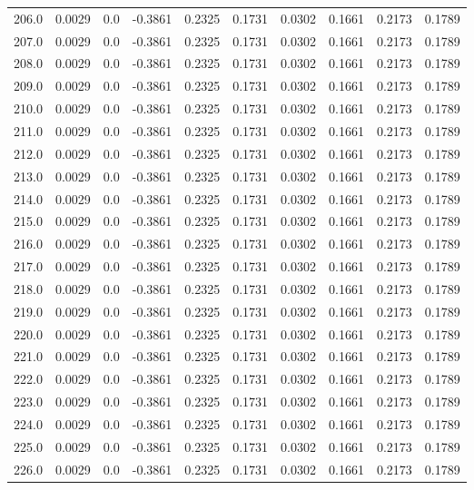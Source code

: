 \begin{longtable}{lrrrrrrrrr}
206.0 & 0.0029 & 0.0 & -0.3861 & 0.2325 & 0.1731 & 0.0302 & 0.1661 & 0.2173 & 0.1789 \\
207.0 & 0.0029 & 0.0 & -0.3861 & 0.2325 & 0.1731 & 0.0302 & 0.1661 & 0.2173 & 0.1789 \\
208.0 & 0.0029 & 0.0 & -0.3861 & 0.2325 & 0.1731 & 0.0302 & 0.1661 & 0.2173 & 0.1789 \\
209.0 & 0.0029 & 0.0 & -0.3861 & 0.2325 & 0.1731 & 0.0302 & 0.1661 & 0.2173 & 0.1789 \\
210.0 & 0.0029 & 0.0 & -0.3861 & 0.2325 & 0.1731 & 0.0302 & 0.1661 & 0.2173 & 0.1789 \\
211.0 & 0.0029 & 0.0 & -0.3861 & 0.2325 & 0.1731 & 0.0302 & 0.1661 & 0.2173 & 0.1789 \\
212.0 & 0.0029 & 0.0 & -0.3861 & 0.2325 & 0.1731 & 0.0302 & 0.1661 & 0.2173 & 0.1789 \\
213.0 & 0.0029 & 0.0 & -0.3861 & 0.2325 & 0.1731 & 0.0302 & 0.1661 & 0.2173 & 0.1789 \\
214.0 & 0.0029 & 0.0 & -0.3861 & 0.2325 & 0.1731 & 0.0302 & 0.1661 & 0.2173 & 0.1789 \\
215.0 & 0.0029 & 0.0 & -0.3861 & 0.2325 & 0.1731 & 0.0302 & 0.1661 & 0.2173 & 0.1789 \\
216.0 & 0.0029 & 0.0 & -0.3861 & 0.2325 & 0.1731 & 0.0302 & 0.1661 & 0.2173 & 0.1789 \\
217.0 & 0.0029 & 0.0 & -0.3861 & 0.2325 & 0.1731 & 0.0302 & 0.1661 & 0.2173 & 0.1789 \\
218.0 & 0.0029 & 0.0 & -0.3861 & 0.2325 & 0.1731 & 0.0302 & 0.1661 & 0.2173 & 0.1789 \\
219.0 & 0.0029 & 0.0 & -0.3861 & 0.2325 & 0.1731 & 0.0302 & 0.1661 & 0.2173 & 0.1789 \\
220.0 & 0.0029 & 0.0 & -0.3861 & 0.2325 & 0.1731 & 0.0302 & 0.1661 & 0.2173 & 0.1789 \\
221.0 & 0.0029 & 0.0 & -0.3861 & 0.2325 & 0.1731 & 0.0302 & 0.1661 & 0.2173 & 0.1789 \\
222.0 & 0.0029 & 0.0 & -0.3861 & 0.2325 & 0.1731 & 0.0302 & 0.1661 & 0.2173 & 0.1789 \\
223.0 & 0.0029 & 0.0 & -0.3861 & 0.2325 & 0.1731 & 0.0302 & 0.1661 & 0.2173 & 0.1789 \\
224.0 & 0.0029 & 0.0 & -0.3861 & 0.2325 & 0.1731 & 0.0302 & 0.1661 & 0.2173 & 0.1789 \\
225.0 & 0.0029 & 0.0 & -0.3861 & 0.2325 & 0.1731 & 0.0302 & 0.1661 & 0.2173 & 0.1789 \\
226.0 & 0.0029 & 0.0 & -0.3861 & 0.2325 & 0.1731 & 0.0302 & 0.1661 & 0.2173 & 0.1789 \\

\end{longtable}
